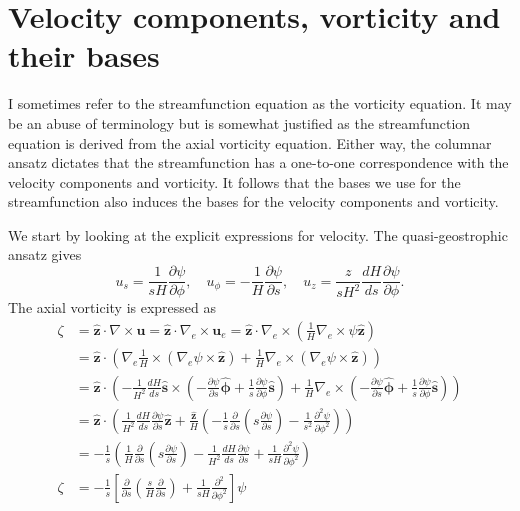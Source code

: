\section{Velocity components, vorticity and their bases}

I sometimes refer to the streamfunction equation as the vorticity equation. It may be an abuse of terminology but is somewhat justified as the streamfunction equation is derived from the axial vorticity equation.
Either way, the columnar ansatz dictates that the streamfunction has a one-to-one correspondence with the velocity components and vorticity. It follows that the bases we use for the streamfunction also induces the bases for the velocity components and vorticity.

We start by looking at the explicit expressions for velocity. The quasi-geostrophic ansatz gives
\begin{equation}
    u_s = \frac{1}{sH} \frac{\partial \psi}{\partial \phi}, \quad
    u_\phi = - \frac{1}{H} \frac{\partial \psi}{\partial s}, \quad 
    u_z = \frac{z}{sH^2} \frac{dH}{ds} \frac{\partial \psi}{\partial \phi}.
\end{equation}
The axial vorticity is expressed as
\begin{equation}
\begin{aligned}
    \zeta &= \hat{\mathbf{z}}\cdot \nabla\times \mathbf{u} = \hat{\mathbf{z}}\cdot \nabla_e \times \mathbf{u}_e = \hat{\mathbf{z}} \cdot \nabla_e \times \left(\frac{1}{H} \nabla_e \times \psi \hat{\mathbf{z}}\right) \\ 
    &= \hat{\mathbf{z}} \cdot \left(\nabla_e \frac{1}{H} \times (\nabla_e \psi \times \hat{\mathbf{z}}) + \frac{1}{H} \nabla_e \times (\nabla_e \psi \times \hat{\mathbf{z}})\right) \\ 
    &= \hat{\mathbf{z}} \cdot \left(-\frac{1}{H^2}\frac{dH}{ds} \hat{\mathbf{s}} \times \left(-\frac{\partial \psi}{\partial s} \hat{\bm{\phi}} + \frac{1}{s} \frac{\partial \psi}{\partial \phi} \hat{\mathbf{s}}\right) + \frac{1}{H} \nabla_e \times \left(-\frac{\partial \psi}{\partial s} \hat{\bm{\phi}} + \frac{1}{s} \frac{\partial \psi}{\partial \phi} \hat{\mathbf{s}}\right)\right) \\ 
    &= \hat{\mathbf{z}} \cdot \left(\frac{1}{H^2} \frac{dH}{ds} \frac{\partial \psi}{\partial s} \hat{\mathbf{z}} + \frac{\hat{\mathbf{z}}}{H} \left(- \frac{1}{s} \frac{\partial}{\partial s} \left(s \frac{\partial \psi}{\partial s}\right) - \frac{1}{s^2} \frac{\partial^2 \psi}{\partial \phi^2}\right)\right) \\ 
    &= - \frac{1}{s} \left(\frac{1}{H}\frac{\partial}{\partial s} \left(s \frac{\partial \psi}{\partial s}\right) - \frac{1}{H^2}\frac{dH}{ds} \frac{\partial \psi}{\partial s} + \frac{1}{sH} \frac{\partial^2 \psi}{\partial \phi^2}\right) \\ 
    \zeta &= - \frac{1}{s} \left[\frac{\partial}{\partial s} \left(\frac{s}{H} \frac{\partial}{\partial s}\right) + \frac{1}{sH}\frac{\partial^2}{\partial \phi^2}\right] \psi
\end{aligned}
\end{equation}
